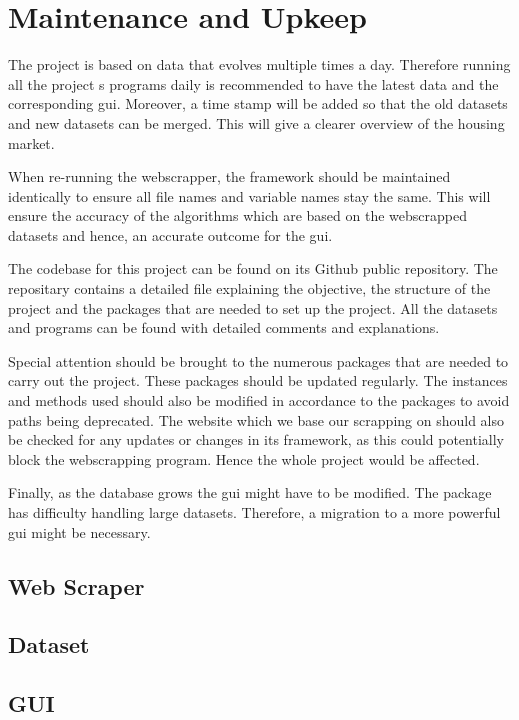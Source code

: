 \documentclass[main]{subfiles}
\begin{document}
\section{Maintenance and Upkeep}

The project is based on data that evolves multiple times a day. 
Therefore running all the project s programs daily is recommended to have the latest data and the corresponding \ac{gui}. 
Moreover, a time stamp will be added so that the old datasets and new datasets can be merged. 
This will give a clearer overview of the housing market. \par
When re-running the webscrapper, the framework should be maintained identically to ensure all file names and variable names stay the same. 
This will ensure the accuracy of the algorithms which are based on the webscrapped datasets and hence, an accurate outcome for the \ac{gui}. \par
The codebase for this project can be found on its Github public repository. 
The repositary contains a detailed \pkg[readme.md] file explaining the objective, the structure of the project and the packages that are needed to set up the project. 
All the datasets and programs can be found with detailed comments and explanations.\par
Special attention should be brought to the numerous packages that are needed to carry out the project. 
These packages should be updated regularly. The instances and methods used should also be modified in accordance to the packages to avoid paths being deprecated.
The website which we base our scrapping on should also be checked for any updates or changes in its framework, 
as this could potentially block the webscrapping program. Hence the whole project would be affected.\par
Finally, as the database grows the \ac{gui} might have to be modified. The \pkg[tkinter] package has difficulty handling large datasets.
Therefore, a migration to a more powerful \ac{gui} might be necessary.


\subsection{Web Scraper}
    


\subsection{Dataset}

\subsection{GUI}
\end{document}
